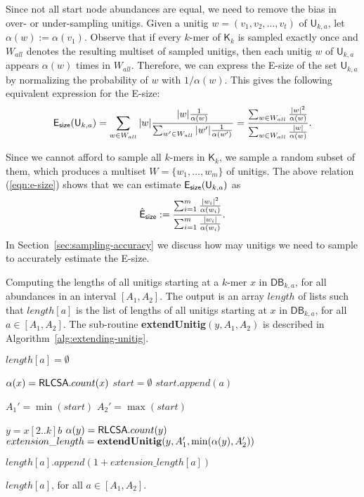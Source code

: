 \documentclass[a4paper,11pt]{article}
\newcommand{\DB}{\mathsf{DB}_{k,a}}
\newcommand{\U}{\mathsf{U}_{k,a}}
\newcommand{\K}{\mathsf{K}}
\newcommand{\abu}{\alpha}
\newcommand{\esize}{{\sf E_{size}}}
\newcommand{\isstart}{{\sf isStart}_{k,a}}
\newcommand{\RLCSA}{{\sf RLCSA}}
\renewcommand{\leq}{\leqslant}
\begin{document}
Since not all start node abundances are equal, we need to remove the bias in over- or under-sampling unitigs. Given a unitig $w = (v_1,v_2,\dots,v_t)$ of $\U$, let $\abu(w) := \abu(v_1)$. Observe that if every $k$-mer of $\K_k$ is sampled exactly once and $W_{all}$ denotes the resulting multiset of sampled unitigs, then each unitig $w$ of $\U$ appears $\abu(w)$ times in $W_{all}$. Therefore, we can express the E-size of the set $\U$ by normalizing the probability of $w$ with $1/\abu(w)$. This gives the following equivalent expression for the E-size:
\begin{equation}
\esize(\U) = \sum_{w \in W_{all}} |w| \frac{|w|\frac{1}{\alpha(w)}}{\sum_{w' \in W_{all}}|w'|\frac{1}{\alpha(w')}} = \frac{\sum_{w \in W_{all}}\frac{|w|^2}{\alpha(w)}}{\sum_{w \in W_{all}}\frac{|w|}{\alpha(w)}}.
\label{eqn:e-size}
\end{equation}

Since we cannot afford to sample all $k$-mers in $\K_k$, we sample a random subset of them, which produces a multiset $W = \{w_1,\dots,w_m\}$ of unitigs. The above relation (\ref{eqn:e-size}) shows that we can estimate $\esize(\U)$ as 
\[\hat{{\sf E}}_{\sf size} := \frac{\sum_{i = 1}^{m}\frac{|w_i|^2}{\alpha(w_i)}}{\sum_{i=1}^{m}\frac{|w_i|}{\alpha(w_i)}}.\]
In Section~\ref{sec:sampling-accuracy} we discuss how may unitigs we need to sample to accurately estimate the E-size.


\begin{algorithm}[h]
\caption{Computing the lengths of all unitigs starting at a $k$-mer $x$ in $\DB$, for all abundances in an interval $[A_1,A_2]$. The output is an array $length$ of lists such that $length[a]$ is the list of lengths of all unitigs starting at $x$ in $\DB$, for all $a \in [A_1,A_2]$. The sub-routine {\bf extendUnitig}$(y,A_1,A_2)$ is described in Algorithm~\ref{alg:extending-unitig}.\label{alg:sampling-for-esize}}


{
	$length[a] = \emptyset$\;
}

$\abu(x) = \RLCSA.count(x)$\;
$start = \emptyset$\;
{
	\If{$\isstart(x)$ {\bf and} $a \leq \abu(x)$}
	{
		$start.append(a)$\;
	}
}
{
	$A_1' = \min(start)$\;
	$A_2' = \max(start)$\;

    {
    	$y = x[2..k]b$\;
    	$\abu(y) = \RLCSA.count(y)$\;
    	$extension\_length = {\bf extendUnitig}(y,A_1', \min(\abu(y),A_2'))$\;
	
    	{
			\If{$a \leq \min(\abu(y),A_2')$}
			{
				$length[a].append(1 + extension\_length[a])$
			}
			
    		
    	}
    }
}
\Return $length[a]$, for all $a \in [A_1,A_2]$.
\end{algorithm}
\end{document}
